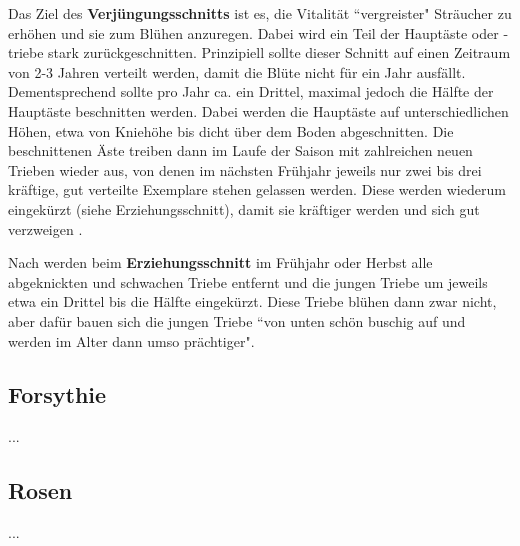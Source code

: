 Das Ziel des \textbf{Verjüngungsschnitts} ist es, die Vitalität ``vergreister" Sträucher zu erhöhen und sie zum Blühen anzuregen. 
Dabei wird ein Teil der Hauptäste oder -triebe stark zurückgeschnitten.
Prinzipiell sollte dieser Schnitt auf einen Zeitraum von 2-3 Jahren verteilt werden, damit die Blüte nicht für ein Jahr ausfällt.
Dementsprechend sollte pro Jahr ca. ein Drittel, maximal jedoch die Hälfte der Hauptäste beschnitten werden.
Dabei werden die Hauptäste auf unterschiedlichen Höhen, etwa von Kniehöhe bis dicht über dem Boden abgeschnitten.
Die beschnittenen Äste treiben dann im Laufe der Saison mit zahlreichen neuen Trieben wieder aus, von denen im nächsten Frühjahr jeweils nur zwei bis drei kräftige, gut verteilte Exemplare stehen gelassen werden.
Diese werden wiederum eingekürzt (siehe Erziehungsschnitt), damit sie kräftiger werden und sich gut verzweigen \citep{Siemens2021}. 

Nach \citet{Siemens2021} werden beim \textbf{Erziehungsschnitt} im Frühjahr oder Herbst alle abgeknickten und schwachen Triebe entfernt und die jungen Triebe um jeweils etwa ein Drittel bis die Hälfte eingekürzt.
Diese Triebe blühen dann zwar nicht, aber dafür bauen sich die jungen Triebe ``von unten schön buschig auf und werden im Alter dann umso prächtiger".

\subsection{Forsythie}

...

\subsection{Rosen}

...

\vfill
\pagebreak